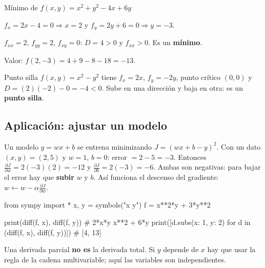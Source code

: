 \begin{tmejemplo}{M\'inimo de $f(x, y)=x^2+y^2-4x+6y$}
\begin{tmpasos}
\item $f_x=2x-4=0\Rightarrow x=2$ y $f_y=2y+6=0\Rightarrow y=-3$.
\item $f_{xx}=2$, $f_{yy}=2$, $f_{xy}=0$: $D=4>0$ y $f_{xx}>0$. Es un \textbf{m\'inimo}.
\item Valor: $f(2,-3)=4+9-8-18=-13$.
\end{tmpasos}
\end{tmejemplo}

\begin{tmejemplo}{Punto silla}
$f(x, y)=x^2-y^2$ tiene $f_x=2x$, $f_y=-2y$, punto cr\'itico $(0, 0)$ y $D=(2)(-2)-0=-4<0$. Sube en una direcci\'on y baja en otra: es un \textbf{punto silla}.
\end{tmejemplo}

\subsection{Aplicaci\'on: ajustar un modelo}
\begin{tmsistemas}
Un modelo $\hat y=wx+b$ se entrena minimizando $J=(wx+b-y)^2$. Con un dato $(x, y)=(2, 5)$ y $w=1$, $b=0$: error $=2-5=-3$. Entonces $\frac{\partial J}{\partial w}=2(-3)(2)=-12$ y $\frac{\partial J}{\partial b}=2(-3)=-6$. Ambas son negativas: para bajar el error hay que \textbf{subir} $w$ y $b$. As\'i funciona el descenso del gradiente: $w\leftarrow w-\alpha\frac{\partial J}{\partial w}$.
\end{tmsistemas}

\begin{tmcodigo}
from sympy import *
x, y = symbols("x y")
f = x**2*y + 3*y**2

print(diff(f, x), diff(f, y))                  # 2*x*y  x**2 + 6*y
print([d.subs({x: 1, y: 2}) for d in (diff(f, x), diff(f, y))])  # [4, 13]
\end{tmcodigo}

\begin{tmcuidado}Una derivada parcial \textbf{no es} la derivada total. Si $y$ depende de $x$ hay que usar la regla de la cadena multivariable; aqu\'i las variables son independientes.\end{tmcuidado}

